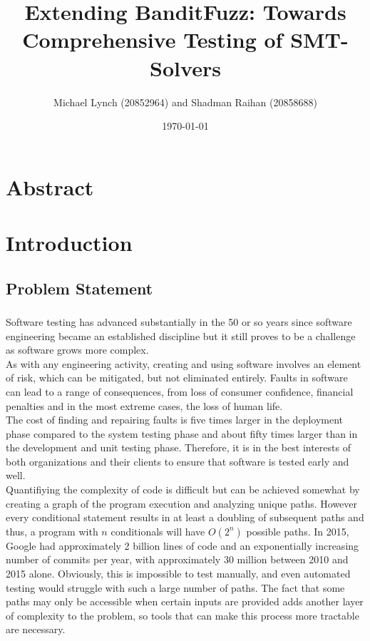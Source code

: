 \documentclass[article,11pt]{article}
\author{Michael Lynch (20852964) and Shadman Raihan (20858688)}
\date{\today}
\title{Extending BanditFuzz: Towards Comprehensive Testing of SMT-Solvers}
\begin{document}
\maketitle

\section*{Abstract}
\label{sec:org2c6e6fc}
\section*{Introduction}
\label{sec:orgb7c40c9}
\subsection*{Problem Statement}
\label{sec:orgef59ae1}
\subsubsection*{}
\label{sec:org42188b4}
Software testing has advanced substantially in the 50 or so years since software engineering became an established discipline but it still proves to be a challenge as software grows more complex.\\
As with any engineering activity, creating and using software involves an element of risk, which can be mitigated, but not eliminated entirely. Faults in software can lead to a range of consequences, from loss of consumer confidence, financial penalties and in the most extreme cases, the loss of human life.\\
The cost of finding and repairing faults is five times larger\cite{bk:amman} in the deployment phase compared to the system testing phase and about fifty times larger\cite{bk:amman} than in the development and unit testing phase. Therefore, it is in the best interests of both organizations and their clients to ensure that software is tested early and well.\\
Quantifiying the complexity of code is difficult but can be achieved somewhat by creating a graph of the program execution and analyzing unique paths\cite{bk:amman}. However every conditional statement results in at least a doubling of subsequent paths and thus, a program with \(n\) conditionals will have \(O(2^n)\) possible paths. In 2015, Google had approximately 2 billion lines of code\cite{vid:googlecode} and an exponentially increasing number of commits per year, with approximately 30 million between 2010 and 2015 alone\cite{vid:googlecode}. Obviously, this is impossible to test manually, and even automated testing would struggle with such a large number of paths. The fact that some paths may only be accessible when certain inputs are provided adds another layer of complexity to the problem, so tools that can make this process more tractable are necessary.\\
\end{document}
